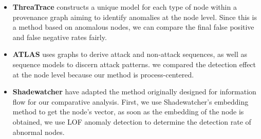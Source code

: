 \begin{itemize}
    \item \textbf{ThreaTrace}\cite{wang2022threatrace} constructs a unique model for each type of node within a provenance graph aiming to identify anomalies at the node level. Since this is a method based on anomalous nodes, we can compare the final false positive and false negative rates fairly.
    \item \textbf{ATLAS}\cite{alsaheel2021atlas} uses graphs to derive attack and non-attack sequences, as well as sequence models to discern attack patterns. we compared the detection effect at the node level because our method is process-centered.
    \item \textbf{Shadewatcher} \cite{zengy2022shadewatcher} have adapted the method originally designed for information flow for our comparative analysis. First, we use Shadewatcher's embedding method to get the node's vector, as soon as the embedding of the node is obtained, we use LOF anomaly detection to determine the detection rate of abnormal nodes.
\end{itemize}

\begin{table}
    \centering
    \small 
    \caption{Process-based and entity-based investigation results.}
\end{table}

